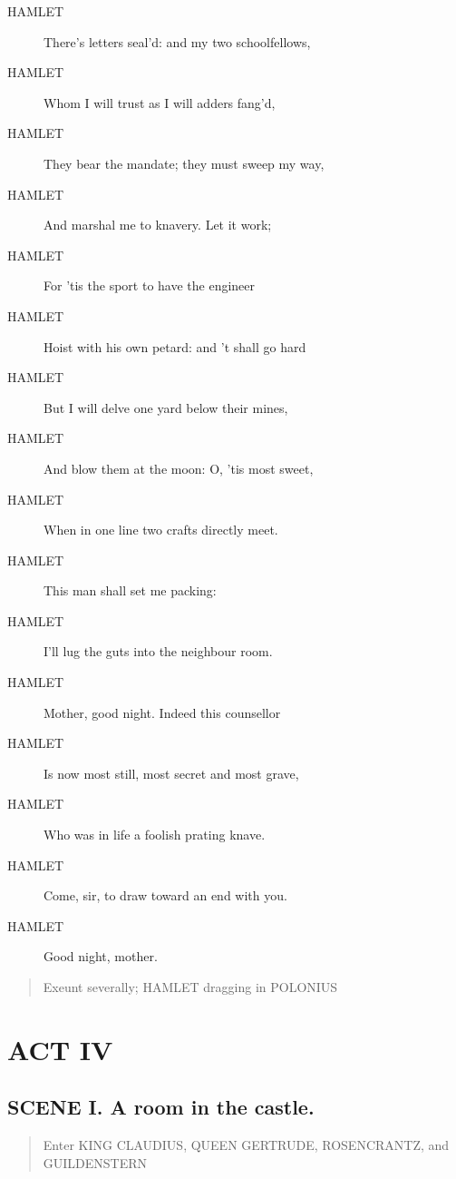 \documentclass{article}
\begin{document}
\begin{description}
            
\item[HAMLET] There's letters seal'd: and my two schoolfellows,
\item[HAMLET] Whom I will trust as I will adders fang'd,
\item[HAMLET] They bear the mandate; they must sweep my way,
\item[HAMLET] And marshal me to knavery. Let it work;
\item[HAMLET] For 'tis the sport to have the engineer
\item[HAMLET] Hoist with his own petard: and 't shall go hard
\item[HAMLET] But I will delve one yard below their mines,
\item[HAMLET] And blow them at the moon: O, 'tis most sweet,
\item[HAMLET] When in one line two crafts directly meet.
\item[HAMLET] This man shall set me packing:
\item[HAMLET] I'll lug the guts into the neighbour room.
\item[HAMLET] Mother, good night. Indeed this counsellor
\item[HAMLET] Is now most still, most secret and most grave,
\item[HAMLET] Who was in life a foolish prating knave.
\item[HAMLET] Come, sir, to draw toward an end with you.
\item[HAMLET] Good night, mother.
\end{description}
          
\begin{quote}
Exeunt severally; HAMLET dragging in POLONIUS
\end{quote}
          
\section{ACT IV}
    
\subsection{SCENE I.  A room in the castle.}
          
\begin{quote}
Enter KING CLAUDIUS, QUEEN GERTRUDE, ROSENCRANTZ,
and GUILDENSTERN
\end{quote}
          
\end{document}
